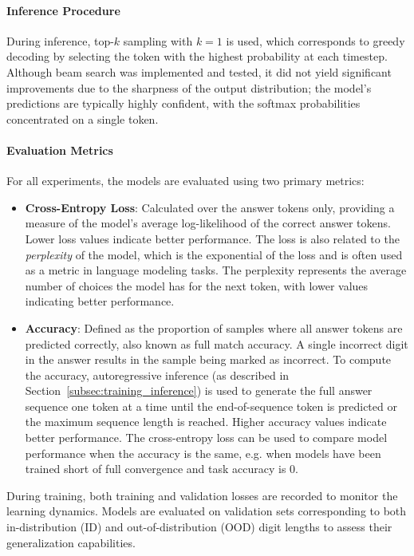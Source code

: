 \paragraph{Inference Procedure}
During inference, top-$k$ sampling with $k=1$ is used, which corresponds to greedy decoding by selecting the token with the highest probability at each timestep. Although beam search was implemented and tested, it did not yield significant improvements due to the sharpness of the output distribution; the model's predictions are typically highly confident, with the softmax probabilities concentrated on a single token.

\paragraph{Evaluation Metrics}
For all experiments, the models are evaluated using two primary metrics:

\begin{itemize}
  \item \textbf{Cross-Entropy Loss}: Calculated over the answer tokens only, providing a measure of the model's average log-likelihood of the correct answer tokens. Lower loss values indicate better performance. The loss is also related to the \emph{perplexity} of the model, which is the exponential of the loss and is often used as a metric in language modeling tasks. The perplexity represents the average number of choices the model has for the next token, with lower values indicating better performance.
  \item \textbf{Accuracy}: Defined as the proportion of samples where all answer tokens are predicted correctly, also known as full match accuracy. A single incorrect digit in the answer results in the sample being marked as incorrect. To compute the accuracy, autoregressive inference (as described in Section~\ref{subsec:training_inference}) is used to generate the full answer sequence one token at a time until the end-of-sequence token is predicted or the maximum sequence length is reached. Higher accuracy values indicate better performance. The cross-entropy loss can be used to compare model performance when the accuracy is the same, e.g. when models have been trained short of full convergence and task accuracy is 0.
\end{itemize}

During training, both training and validation losses are recorded to monitor the learning dynamics. Models are evaluated on validation sets corresponding to both in-distribution (ID) and out-of-distribution (OOD) digit lengths to assess their generalization capabilities.


